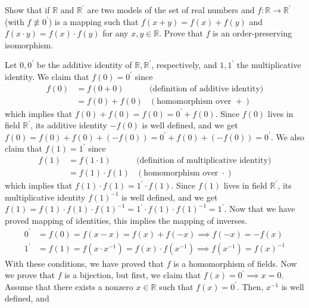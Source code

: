  \begin{exercise}[Zorich 2.2.23]
    Show that if $\mathbb{R}$ and $\mathbb{R}^\prime$ are two models of the set of real numbers and $f: \mathbb{R} \to \mathbb{R}^\prime$ (with $f \not\equiv 0^\prime$) is a mapping such that $f(x + y) = f(x) + f(y)$ and $f(x \cdot y) = f(x) \cdot f(y)$ for any $x, y \in \mathbb{R}$. Prove that $f$ is an order-preserving isomorphism. 
  \end{exercise}
  \begin{solution}
    Let $0, 0^\prime$ be the additive identity of $\mathbb{R}, \mathbb{R}^\prime$, respectively, and $1, 1^\prime$ the multiplicative identity. We claim that $f(0) = 0^\prime$ since
    \begin{align*}
      f(0) & = f(0 + 0) & \text{(definition of additive identity)} \\
      & = f(0) + f(0) & (\text{homomorphism over } + )
    \end{align*}
    which implies that $f(0) + f(0) = f(0) = 0^\prime + f(0) $. Since $f(0)$ lives in field $\mathbb{R}^\prime$, its additive identity $-f(0)$ is well defined, and we get $f(0) = f(0) + f(0) + (-f(0)) = 0^\prime + f(0) + (-f(0)) = 0^\prime$. We also claim that $f(1) = 1^\prime$ since 
    \begin{align*}
      f(1) & = f(1 \cdot 1) & \text{(definition of multiplicative identity)} \\
      & = f(1) \cdot f(1) & (\text{homomorphism over } \cdot ) 
    \end{align*}
    which implies that $f(1) \cdot f(1) = 1^\prime \cdot f(1)$. Since $f(1)$ lives in field $\mathbb{R}^\prime$, its multiplicative identity $f(1)^{-1}$ is well defined, and we get $f(1) = f(1) \cdot f(1) \cdot f(1)^{-1} = 1^\prime \cdot f(1) \cdot f(1)^{-1} = 1^\prime$. Now that we have proved mapping of identities, this implies the mapping of inverses. 
    \begin{align*}
      0^\prime & = f(0) = f(x - x) = f(x) + f(-x) \implies f(-x) = -f(x) \\
      1^\prime & = f(1) = f(x \cdot x^{-1}) = f(x) \cdot f(x^{-1}) \implies f(x^{-1}) = f(x)^{-1}
    \end{align*}
    With these conditions, we have proved that $f$ is a homomorphism of fields. Now we prove that $f$ is a bijection, but first, we claim that $f(x) = 0^\prime \implies x = 0$. Assume that there exists a nonzero $x \in \mathbb{R}$ such that $f(x) = 0^\prime$. Then, $x^{-1}$ is well defined, and 
    \begin{align*}

\end{align*}
\end{solution}

